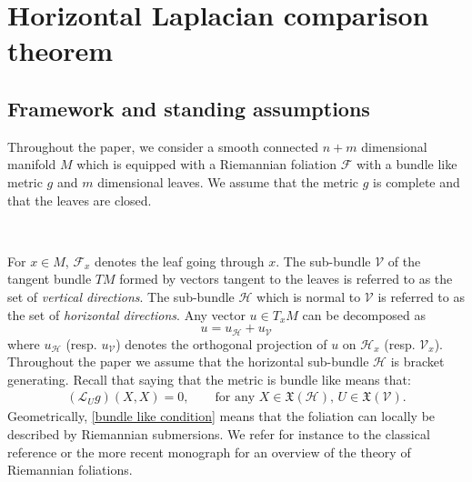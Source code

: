 \documentclass[11pt]{article}
\numberwithin{equation}{section}
\newcommand{\Ho}{\mathcal H}
\newcommand{\V}{\mathcal V}
\begin{document}
\section{Horizontal Laplacian comparison theorem} \label{sec:RFoliation}

\subsection{Framework and standing assumptions} \label{ssec:foliation}

Throughout the paper, we consider a smooth connected $n+m$ dimensional manifold $M$ which is equipped with a Riemannian foliation $\mathcal{F}$ with a bundle like metric $g$ and $m$ dimensional leaves.  We  assume that the metric $g$ is complete and that the leaves are closed.



\

For $x \in M$, $\mathcal{F}_x$ denotes the leaf going through $x$. The sub-bundle $\mathcal{V}$ of the tangent bundle $TM$ formed by vectors tangent to the leaves is referred  to as the set of \emph{vertical directions}. The sub-bundle $\mathcal{H}$ which is normal to $\mathcal{V}$ is referred to as the set of \emph{horizontal directions}.  Any vector $u \in T_xM$ can  be decomposed as 
\[
u=u_\mathcal{H} +u_\mathcal{V}
\]
where $u_\mathcal{H}$ (resp. $u_\mathcal{V}$) denotes the orthogonal projection of $u$ on $\mathcal{H}_x$  (resp. $\mathcal{V}_x$).  Throughout the paper we assume that the horizontal sub-bundle $\Ho$ is bracket generating. Recall that saying that the metric is bundle like means that:
\begin{align}\label{bundle like condition}
 (\mathcal{L}_U g)(X, X)=0, \qquad \text{for any $X \in \mathfrak{X}(\Ho)$, $U \in \mathfrak{X}(\V)$.}
 \end{align}
Geometrically,  \eqref{bundle like condition} means that the foliation can locally be described by Riemannian submersions. We refer for instance  to the classical reference  \cite{Tondeur} or the more recent monograph \cite{Gromoll} for an overview of the theory of Riemannian foliations.
\end{document}
